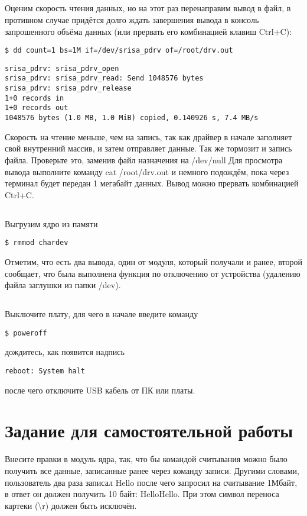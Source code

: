 \subsection{}Оценим скорость чтения данных, но на этот раз перенаправим вывод в файл, в противном случае придётся долго ждать завершения вывода в консоль запрошенного объёма данных (или прервать его комбинацией клавиш Ctrl+C): 
\begin{lstlisting}[style=bash]
$ dd count=1 bs=1M if=/dev/srisa_pdrv of=/root/drv.out
\end{lstlisting}
\begin{lstlisting}[style=stdout]
srisa_pdrv: srisa_pdrv_open 
srisa_pdrv: srisa_pdrv_read: Send 1048576 bytes 
srisa_pdrv: srisa_pdrv_release 
1+0 records in 
1+0 records out 
1048576 bytes (1.0 MB, 1.0 MiB) copied, 0.140926 s, 7.4 MB/s
\end{lstlisting}
Скорость на чтение меньше, чем на запись, так как драйвер в начале заполняет свой внутренний массив, и затем отправляет данные. Так же тормозит и запись файла. Проверьте это, заменив файл назначения на /dev/null Для просмотра вывода выполните команду cat /root/drv.out и немного подождём, пока через терминал будет передан 1 мегабайт данных. Вывод можно прервать комбинацией Ctrl+C.

\subsection{}Выгрузим ядро из памяти
\begin{lstlisting}[style=bash]
$ rmmod chardev
\end{lstlisting}
Отметим, что есть два вывода, один от модуля, который получали и ранее, второй сообщает, что была выполнена функция по отключению от устройства (удалению файла заглушки из папки /dev).  

\subsection{} Выключите плату, для чего в начале введите команду
\begin{lstlisting}[style=bash]
	$ poweroff
\end{lstlisting}
дождитесь, как появится надпись
\begin{lstlisting}[style=stdout]
	reboot: System halt
\end{lstlisting}
после чего отключите USB кабель от ПК или платы.  

\section{Задание для самостоятельной работы}
Внесите правки в модуль ядра, так, что бы командой считывания можно было получить все данные, записанные ранее через команду записи. Другими словами, пользователь два раза записал Hello после чего запросил на считывание 1Мбайт, в ответ он должен получить 10 байт: HelloHello. При этом символ переноса картеки (\textbackslash{}r) должен быть исключён.

